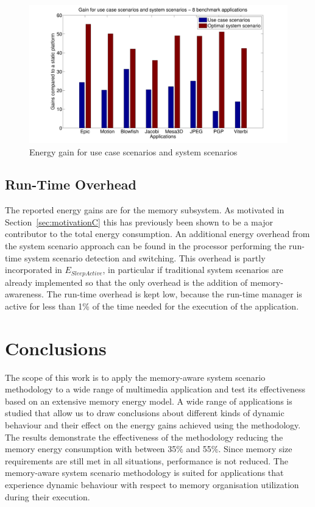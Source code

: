 \begin{figure}
\centering
\includegraphics[width=\textwidth]{C/usecase.pdf}
\caption{Energy gain for use case scenarios and system scenarios}
\label{fig:usecaseC}
\end{figure}

\subsection{Run-Time Overhead}  

The reported energy gains are for the memory subsystem. 
As motivated in Section~\ref{sec:motivationC} this has previously been shown to be a major contributor to the total energy consumption. 
An additional energy overhead from the system scenario approach can be found in the processor performing the run-time system scenario detection and switching. 
This overhead is partly incorporated in $E_{SleepActive}$, in particular if traditional system scenarios are already implemented so that the only overhead is the addition of memory-awareness.
The run-time overhead is kept low, because the run-time manager is active for less than 1\% of the time needed for the execution of the application. 

\section{Conclusions}
\label{sec:conclusionC}

The scope of this work is to apply the memory-aware system scenario methodology to a wide range of multimedia application and test its effectiveness based on an extensive memory energy model. 
A wide range of applications is studied that allow us to draw conclusions about different kinds of dynamic behaviour and their effect on the energy gains achieved using the methodology. 
The results demonstrate the effectiveness of the methodology reducing the memory energy consumption with between 35\% and 55\%. 
Since memory size requirements are still met in all situations, performance is not reduced. 
The memory-aware system scenario methodology is suited for applications that experience dynamic behaviour with respect to memory organisation utilization during their execution.

